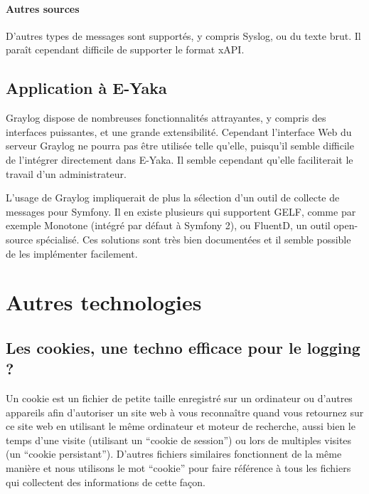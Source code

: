                 \paragraph{Autres sources}
                    D'autres types de messages sont supportés, y compris Syslog, ou du texte brut. Il paraît cependant difficile de supporter le format xAPI.

        \subsection{Application à E-Yaka}

            Graylog dispose de nombreuses fonctionnalités attrayantes, y compris des interfaces puissantes, et une grande extensibilité. Cependant l'interface Web du serveur Graylog ne pourra pas être utilisée telle qu'elle, puisqu'il semble difficile de l'intégrer directement dans E-Yaka. Il semble cependant qu'elle faciliterait le travail d'un administrateur.

            L'usage de Graylog impliquerait de plus la sélection d'un outil de collecte de messages pour Symfony. Il en existe plusieurs qui supportent GELF, comme par exemple Monotone (intégré par défaut à Symfony 2), ou FluentD, un outil open-source spécialisé. Ces solutions sont très bien documentées et il semble possible de les implémenter facilement.

    
    \section{Autres technologies}
    
        \subsection{Les cookies, une techno efficace pour le logging ?}
        
            Un cookie est un fichier de petite taille enregistré sur un ordinateur ou d'autres appareils afin d'autoriser un site web à vous reconnaître quand vous retournez sur ce site web en utilisant le même ordinateur et moteur de recherche, aussi bien le temps d'une visite (utilisant un \enquote{cookie de session}) ou lors de multiples visites (un \enquote{cookie persistant}). D'autres fichiers similaires fonctionnent de la même manière et nous utilisons le mot \enquote{cookie} pour faire référence à tous les fichiers qui collectent des informations de cette façon.
            

